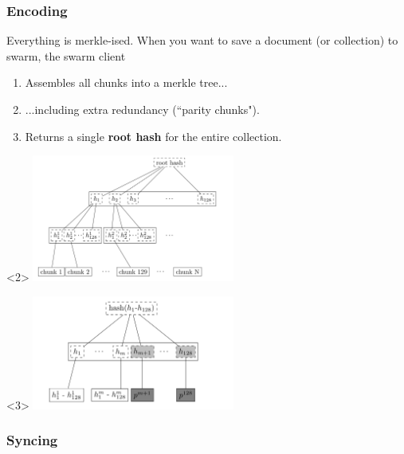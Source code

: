 \subsubsection{Encoding}

\begin{frame}[t]{Everything is merkle-ised.}
When you want to save a document (or collection) to swarm, the swarm client
\begin{enumerate}
 \item<2-> Assembles all chunks into a merkle tree...
 \item<3-> ...including extra redundancy (``parity chunks").
 \item<4-> Returns a single \textbf{root hash} for the entire collection.
\end{enumerate}

\begin{center}
 \begin{onlyenv}<2>
  \includegraphics[width=0.5\textwidth]{chunk-tree.png}
 \end{onlyenv}
 \begin{onlyenv}<3>
  \includegraphics[width=0.5\textwidth]{erasure-coded-tree.png}
 \end{onlyenv}

\end{center}



\end{frame}



\subsubsection{Syncing}

